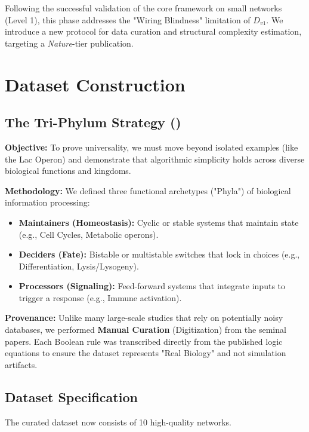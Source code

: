 





Following the successful validation of the core framework on small networks (Level 1), this phase addresses the "Wiring Blindness" limitation of $D_{v1}$. We introduce a new protocol for data curation and structural complexity estimation, targeting a \textit{Nature}-tier publication.

\section{Dataset Construction}

\subsection{The Tri-Phylum Strategy ()}
\textbf{Objective:} To prove universality, we must move beyond isolated examples (like the Lac Operon) and demonstrate that algorithmic simplicity holds across diverse biological functions and kingdoms.

\textbf{Methodology:}
We defined three functional archetypes ("Phyla") of biological information processing:
\begin{itemize}
    \item \textbf{Maintainers (Homeostasis):} Cyclic or stable systems that maintain state (e.g., Cell Cycles, Metabolic operons).
    \item \textbf{Deciders (Fate):} Bistable or multistable switches that lock in choices (e.g., Differentiation, Lysis/Lysogeny).
    \item \textbf{Processors (Signaling):} Feed-forward systems that integrate inputs to trigger a response (e.g., Immune activation).
\end{itemize}

\textbf{Provenance:}
Unlike many large-scale studies that rely on potentially noisy databases, we performed \textbf{Manual Curation} (Digitization) from the seminal papers. Each Boolean rule was transcribed directly from the published logic equations to ensure the dataset represents "Real Biology" and not simulation artifacts.

\subsection{Dataset Specification}
The curated dataset now consists of 10 high-quality networks.

